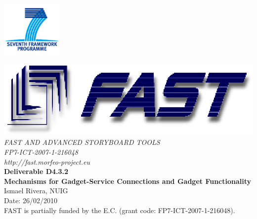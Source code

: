 \documentclass{fast_latex}
\newcommand\deliverableNumber{D4.3.2}
\newcommand\deliverableTitle{Mechanisms for Gadget-Service Connections and Gadget Functionality}
\newcommand\authorOne{Ismael Rivera, NUIG}
\newcommand\authorTwo{Author 2}
\begin{document}

\def\note#1{\marginpar{\footnotesize#1}} %



\thispagestyle{empty}


\begin{flushright}
	\includegraphics[width=3cm]{images/FP7_logo}
\end{flushright}

\vspace{1cm}

	\begin{center}
		\includegraphics{images/FAST_logo}\\
		\vspace{1cm}
		{\LARGE{\sffamily \emph{FAST AND ADVANCED STORYBOARD TOOLS}}}\\
		\vspace{0.5cm}
		{\LARGE \sffamily \emph{FP7-ICT-2007-1-216048}}\\
		\vspace{0.5cm}
		{\LARGE \sffamily \emph{http://fast.morfeo-project.eu}}\\
		\vspace{4cm}
		{\LARGE \sffamily \textbf{Deliverable \deliverableNumber}}\\
		\vspace{0.5cm}
		{\LARGE \sffamily \textbf{\deliverableTitle}}\\
		\vspace{2cm}
		{\large \sffamily \authorOne}\\
		\vspace{0.5cm}
		\vfill
		{\large \sffamily Date: 26/02/2010}\\
		\vspace{1cm}
		{\sffamily FAST is partially funded by the E.C. (grant code: FP7-ICT-2007-1-216048).}
		
	\end{center}
\end{document}
